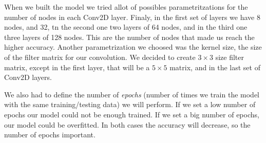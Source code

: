 \documentclass{article}
\begin{document}
When we built the model we tried allot of possibles parametritzations for the number of nodes in each Conv2D layer. Finaly, in the first set of layers we have 8 nodes, and 32, tn the second one two layers of 64 nodes, and in the third one three layers of 128 nodes. This are the number of nodes that made us reach the higher accuracy. Another parametrization we choosed was the kernel size, the size of the filter matrix for our convolution. We decided to create $3 \times 3$ size filter matrix, except in the first layer, that will be a $5 \times 5$ matrix, and in the last set of Conv2D layers.

We also had to define the number of \textit{epochs} (number of times we train the model with the same training/testing data) we will perform. If we set a low number of epochs our model could not be enough trained. If we set a big number of epochs, our model could be overfitted. In both cases the accuracy will decrease, so the number of epochs important.
\end{document}
